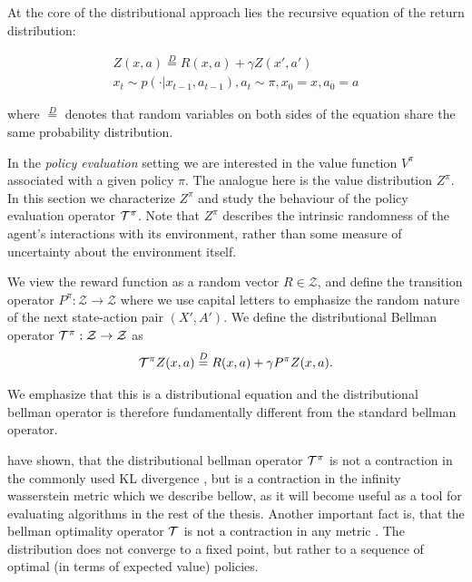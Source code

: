 At the core of the distributional approach lies the recursive equation of the return distribution:

\begin{equation}
\begin{split}
Z(x, a) \overset{D}{=} R(x, a) + \gamma Z(x', a')\\
x_t \sim p(\cdot|x_{t-1}, a_{t-1}), a_t \sim \pi, x_0 = x, a_0 = a
\end{split}
\end{equation}

where $\overset{D}{=}$ denotes that random variables on both sides of the equation share the same probability distribution.

In the \emph{policy evaluation} setting \citep{sutton98reinforcement} we are interested in the value function $V^\pi$ associated with a given policy $\pi$. The analogue here is the value distribution $Z^\pi$. In this section we characterize $Z^\pi$ and study the behaviour of the policy evaluation operator $\mathcal{T}^\pi$. Note that $Z^\pi$ describes the intrinsic randomness of the agent's interactions with its environment, rather than some measure of uncertainty about the environment itself.
%

We view the reward function as a random vector $R \in \mathcal{Z}$, and define the transition operator $P^\pi : \mathcal{Z} \to \mathcal{Z}$
where we use capital letters to emphasize the random nature of the next state-action pair $(X', A')$.
We define the distributional Bellman operator $\mathcal{T}^\pi : \mathcal{Z} \to \mathcal{Z}$ as
\begin{equation}
\mathcal{T}^\pi Z(x,a) \overset{D}{=} R(x,a) + \gamma P^\pi Z(x,a).
\end{equation}

We emphasize that this is a distributional equation and the distributional bellman operator is therefore fundamentally different from the standard bellman operator.

\citet{bellemare2017distributional} have shown, that the distributional bellman operator $\mathcal{T}^\pi$ is not a contraction in the commonly used KL divergence \cite{...}, but is a contraction in the infinity wasserstein metric which we describe bellow, as it will become useful as a tool for evaluating algorithms in the rest of the thesis. Another important fact is, that the bellman optimality operator $\mathcal{T}$ is not a contraction in any metric . The distribution does not converge to a fixed point, but rather to a sequence of optimal (in terms of expected value) policies.

